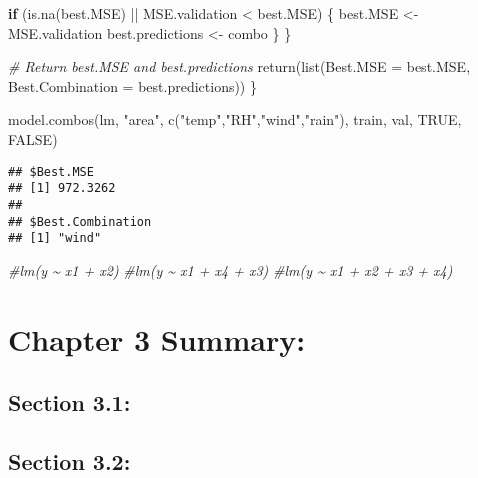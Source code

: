 \documentclass[
]{article}
\newenvironment{Shaded}{\begin{snugshade}}{\end{snugshade}}
\newcommand{\AttributeTok}[1]{\textcolor[rgb]{0.77,0.63,0.00}{#1}}
\newcommand{\CommentTok}[1]{\textcolor[rgb]{0.56,0.35,0.01}{\textit{#1}}}
\newcommand{\ConstantTok}[1]{\textcolor[rgb]{0.00,0.00,0.00}{#1}}
\newcommand{\ControlFlowTok}[1]{\textcolor[rgb]{0.13,0.29,0.53}{\textbf{#1}}}
\newcommand{\FunctionTok}[1]{\textcolor[rgb]{0.00,0.00,0.00}{#1}}
\newcommand{\NormalTok}[1]{#1}
\newcommand{\OtherTok}[1]{\textcolor[rgb]{0.56,0.35,0.01}{#1}}
\newcommand{\SpecialCharTok}[1]{\textcolor[rgb]{0.00,0.00,0.00}{#1}}
\newcommand{\StringTok}[1]{\textcolor[rgb]{0.31,0.60,0.02}{#1}}
\begin{document}
\begin{Shaded}
\begin{Highlighting}[]
    \ControlFlowTok{if}\NormalTok{ (}\FunctionTok{is.na}\NormalTok{(best.MSE) }\SpecialCharTok{||}\NormalTok{ MSE.validation }\SpecialCharTok{\textless{}}\NormalTok{ best.MSE) \{}
\NormalTok{      best.MSE }\OtherTok{\textless{}{-}}\NormalTok{ MSE.validation}
\NormalTok{      best.predictions }\OtherTok{\textless{}{-}}\NormalTok{ combo}
\NormalTok{    \}}
\NormalTok{  \}}
  
  \CommentTok{\# Return best.MSE and best.predictions}
  \FunctionTok{return}\NormalTok{(}\FunctionTok{list}\NormalTok{(}\AttributeTok{Best.MSE =}\NormalTok{ best.MSE, }\AttributeTok{Best.Combination =}\NormalTok{ best.predictions))}
\NormalTok{\}}

\FunctionTok{model.combos}\NormalTok{(lm, }\StringTok{"area"}\NormalTok{, }\FunctionTok{c}\NormalTok{(}\StringTok{"temp"}\NormalTok{,}\StringTok{"RH"}\NormalTok{,}\StringTok{"wind"}\NormalTok{,}\StringTok{"rain"}\NormalTok{), train, val, }\ConstantTok{TRUE}\NormalTok{, }\ConstantTok{FALSE}\NormalTok{)}
\end{Highlighting}
\end{Shaded}

\begin{verbatim}
## $Best.MSE
## [1] 972.3262
## 
## $Best.Combination
## [1] "wind"
\end{verbatim}

\begin{Shaded}
\begin{Highlighting}[]
\CommentTok{\#lm(y \textasciitilde{} x1 + x2)}
\CommentTok{\#lm(y \textasciitilde{} x1 + x4 + x3)}
\CommentTok{\#lm(y \textasciitilde{} x1 + x2 + x3 + x4)}
\end{Highlighting}
\end{Shaded}

\hypertarget{chapter-3-summary}{%
\section{Chapter 3 Summary:}\label{chapter-3-summary}}

\hypertarget{section-3.1}{%
\subsection{Section 3.1:}\label{section-3.1}}

\hypertarget{section-3.2}{%
\subsection{Section 3.2:}\label{section-3.2}}
\end{document}
